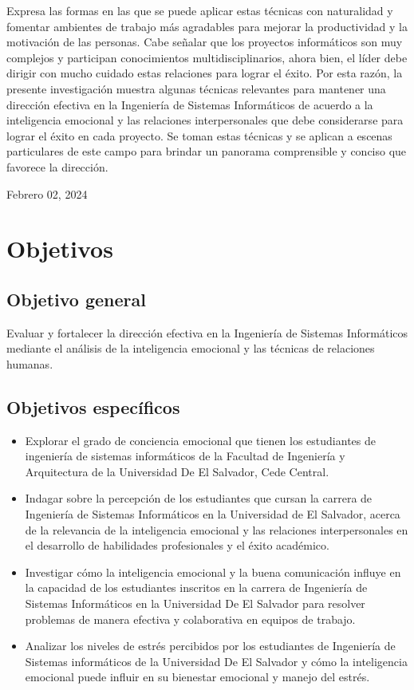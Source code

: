 \documentclass[journal]{IEEEtran}
\begin{document}
Expresa las formas en las que se puede aplicar estas técnicas con naturalidad y fomentar ambientes de trabajo más agradables para mejorar la productividad y la motivación de las personas. Cabe señalar que los proyectos informáticos son muy complejos y participan conocimientos multidisciplinarios, ahora bien, el líder debe dirigir con mucho cuidado estas relaciones para lograr el éxito. Por esta razón, la presente investigación muestra algunas técnicas relevantes para mantener una dirección efectiva en la Ingeniería de Sistemas Informáticos de acuerdo a la inteligencia emocional y las relaciones interpersonales que debe considerarse para lograr el éxito en cada proyecto. Se toman estas técnicas y se aplican a escenas particulares de este campo para brindar un panorama comprensible y conciso que favorece la dirección.

\hfill Febrero 02, 2024

\section{Objetivos}

\subsection{Objetivo general}
Evaluar y fortalecer la dirección efectiva en la Ingeniería de Sistemas Informáticos mediante el análisis de la inteligencia emocional y las técnicas de relaciones humanas.

\subsection{Objetivos específicos}
\begin{itemize}
	\item Explorar el grado de conciencia emocional que tienen los estudiantes de ingeniería de sistemas informáticos de la Facultad de Ingeniería y Arquitectura de la Universidad De El Salvador, Cede Central.
	\item Indagar sobre la percepción de los estudiantes que cursan la carrera de Ingeniería de Sistemas Informáticos en la Universidad de El Salvador, acerca de la relevancia de la inteligencia emocional y las relaciones interpersonales en el desarrollo de habilidades profesionales y el éxito académico.
	\item Investigar cómo la inteligencia emocional y la buena comunicación influye en la capacidad de los estudiantes inscritos en la carrera de Ingeniería de Sistemas Informáticos en la Universidad De El Salvador para resolver problemas de manera efectiva y colaborativa en equipos de trabajo.
	\item Analizar los niveles de estrés percibidos por los estudiantes de Ingeniería de Sistemas informáticos de la Universidad De El Salvador y cómo la inteligencia emocional puede influir en su bienestar emocional y manejo del estrés.
\end{itemize}
\end{document}
